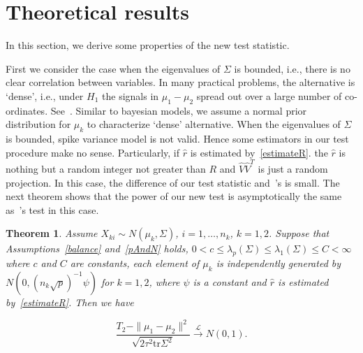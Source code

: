 \documentclass[review]{elsarticle}
\theoremstyle{plain}
\newtheorem{theorem}{\quad\quad Theorem}
\theoremstyle{definition}
\theoremstyle{remark}
\begin{document}
\section{Theoretical results}

In this section, we derive some properties of the new test statistic.


First we consider the case  when the eigenvalues of $\Sigma$ is bounded, i.e., there is no clear correlation between variables.
In many practical problems, the alternative is `dense', i.e., under $H_1$ the signals in $\mu_1-\mu_2$ spread out over a large number of co-ordinates. See~\cite{Tony2013}.
Similar to bayesian models, we assume a normal prior distribution for $\mu_k$ to characterize `dense' alternative.
When the eigenvalues of $\Sigma$ is bounded, spike variance model is not valid. Hence some estimators in our test procedure make no sense. Particularly, if  $\hat{r}$ is estimated by~\eqref{estimateR}. the $\hat{r}$ is nothing but a random integer not greater than $R$ and $\hat{V}\hat{V}^T$ is just a random projection. In this case, the difference of our test statistic and~\cite{Chen2010A}'s is small.
The next theorem shows that  the power of our new test is asymptotically the same as~\cite{Chen2010A}'s test in this case.


\begin{theorem}\label{sameTheorem}
   Assume $X_{ki}\sim N(\mu_k,\Sigma)$,  $i=1,\ldots,n_k$, $k=1,2$.
    Suppose that Assumptions~\ref{balance} and~\ref{pAndN} holds, $0<c\leq\lambda_p(\Sigma)\leq\lambda_1(\Sigma)\leq C<\infty$ where $c$ and $C$ are constants, each element of $\mu_k$ is independently generated by $N(0,{(n_k\sqrt{p})}^{-1}\psi)$ for $k=1,2$, where $\psi$ is a constant and  $\hat{r}$ is estimated by~\eqref{estimateR}.
    Then we have
    
\begin{equation*}
    \frac{T_2-\|\mu_1-\mu_2\|^2}{\sqrt{2\tau^2 \mathrm{tr}\Sigma^2}} \xrightarrow{\mathcal{L}} N(0,1).
\end{equation*}
\end{theorem}
\end{document}
